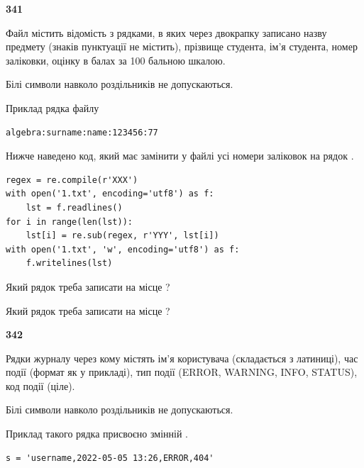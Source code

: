 \newpage

{\begin {center}\textbf{ 341}\end {center}}\par
Файл  містить відомість з рядками, в яких через двокрапку записа\-но назву предмету (знаків пунктуації не містить), прізвище студента, ім'я студента, номер залі\-ков\-ки, оцінку в балах за 100 бальною шкалою.

Білі символи навколо роздільників не допускаються.

Приклад рядка файлу



\begin{verbatim}
algebra:surname:name:123456:77
\end{verbatim}


Нижче наведено код, який має замінити у файлі усі номери заліковок на рядок \code{***}.



\begin{verbatim}
regex = re.compile(r'XXX')
with open('1.txt', encoding='utf8') as f:
    lst = f.readlines()
for i in range(len(lst)):
    lst[i] = re.sub(regex, r'YYY', lst[i])
with open('1.txt', 'w', encoding='utf8') as f:
    f.writelines(lst)
\end{verbatim}







Який рядок треба записати на місце  ?\par
\vspace{5mm}


Який рядок треба записати на місце  ?\par


\newpage

{\begin {center}\textbf{ 342}\end {center}}\par
Рядки журналу через кому містять ім'я користувача (складається з латиниці), час події (фор\-мат як у прикладі), тип події (ERROR, WARNING, INFO, STATUS), код події (ціле).

Білі символи навколо роздільників не допускаються.

Приклад такого рядка присвоєно змінній .



\begin{verbatim}
s = 'username,2022-05-05 13:26,ERROR,404'
\end{verbatim}


